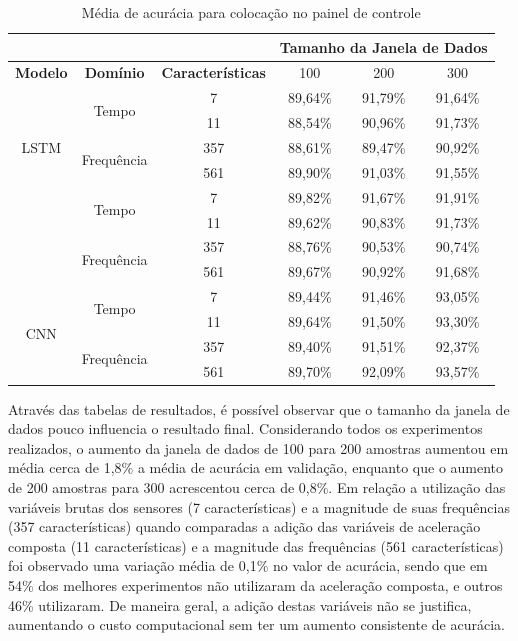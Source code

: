 \begin{table}[h!]
\scriptsize
\centering
\caption{Média de acurácia para colocação no painel de controle}
\label{table:dashboard_results_tipo_superficie_2}
\begin{tabular}{cccccc}
\cmidrule(l){4-6}
 & \multicolumn{1}{l}{\textbf{}} & \multicolumn{1}{l}{} & \multicolumn{3}{c}{\textbf{Tamanho da Janela de Dados}} \\ \midrule
\textbf{Modelo} & \textbf{Domínio} & \textbf{Características} & 100 & 200 & \multicolumn{1}{c}{300} \\ \midrule
\multirow{5}{*}{LSTM} & \multirow{2}{*}{Tempo} & 7 & 89,64\% & \cellcolor[HTML]{34FF34}91,79\% & 91,64\% \\ \cmidrule(l){3-6} 
 &  & 11 & 88,54\% & 90,96\% & 91,73\% \\ \cmidrule(l){2-6} 
 & \multirow{2}{*}{Frequência} & 357 & 88,61\% & 89,47\% & 90,92\% \\ \cmidrule(l){3-6} 
 &  & 561 & 89,90\% & 91,03\% & 91,55\% \\ \midrule
\multirow{5}{*}{GRU} & \multirow{2}{*}{Tempo} & 7 & 89,82\% & 91,67\% & \cellcolor[HTML]{34FF34}91,91\% \\ \cmidrule(l){3-6} 
 &  & 11 & 89,62\% & 90,83\% & 91,73\% \\ \cmidrule(l){2-6} 
 & \multirow{2}{*}{Frequência} & 357 & 88,76\% & 90,53\% & 90,74\% \\ \cmidrule(l){3-6} 
 &  & 561 & 89,67\% & 90,92\% & 91,68\% \\ \midrule
\multirow{5}{*}{CNN} & \multirow{2}{*}{Tempo} & 7 & 89,44\% & 91,46\% & 93,05\% \\ \cmidrule(l){3-6} 
 &  & 11 & 89,64\% & 91,50\% & 93,30\% \\ \cmidrule(l){2-6} 
 & \multirow{2}{*}{Frequência} & 357 & 89,40\% & 91,51\% & 92,37\% \\ \cmidrule(l){3-6} 
 &  & 561 & 89,70\% & 92,09\% & \cellcolor[HTML]{34FF34}93,57\% \\ \bottomrule
\end{tabular}
\end{table}


Através das tabelas de resultados, é possível observar que o tamanho da janela de dados pouco influencia o resultado final. Considerando todos os experimentos realizados, o aumento da janela de dados de 100 para 200 amostras aumentou em média cerca de 1,8\% a média de acurácia em validação, enquanto que o aumento de 200 amostras para 300 acrescentou cerca de 0,8\%. Em relação a utilização das variáveis brutas dos sensores (7 características) e a magnitude de suas frequências (357 características) quando comparadas a adição das variáveis de aceleração composta (11 características) e a magnitude das frequências (561 características) foi observado uma variação média de 0,1\% no valor de acurácia, sendo que em 54\% dos melhores experimentos não utilizaram da aceleração composta, e outros 46\% utilizaram. De maneira geral, a adição destas variáveis não se justifica, aumentando o custo computacional sem ter um aumento consistente de acurácia.

